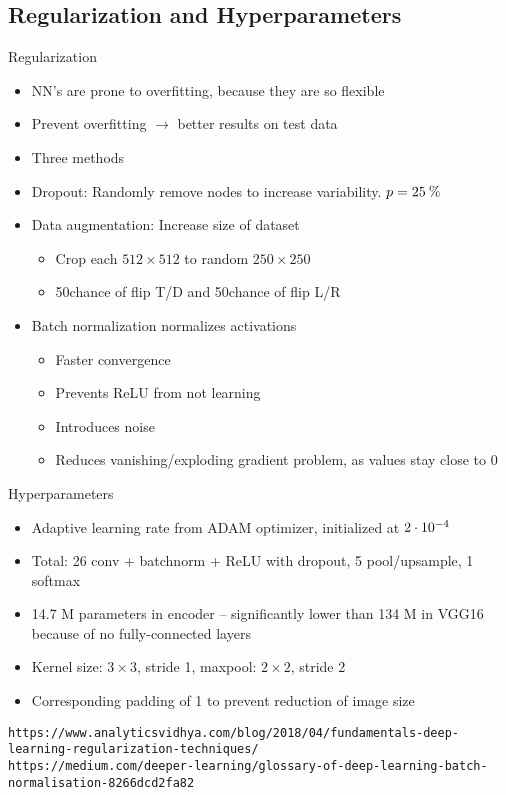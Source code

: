 \documentclass[12pt,fleqn]{article}
\begin{document}
\subsection{Regularization and Hyperparameters}
Regularization
\begin{itemize}
	\item NN's are prone to overfitting, because they are so flexible
	\item Prevent overfitting $ \to $ better results on test data
	\item Three methods
	\item Dropout: Randomly remove nodes to increase variability. $ p=25\:\text{\%{}} $
	\item Data augmentation: Increase size of dataset
	\begin{itemize}
		\item Crop each $ 512\times 512 $ to random $ 250\times 250 $
		\item 50\pro chance of flip T/D and 50\pro chance of flip L/R
	\end{itemize}
	\item Batch normalization normalizes activations
	\begin{itemize}
		\item Faster convergence
		\item Prevents ReLU from not learning
		\item Introduces noise
		\item Reduces vanishing/exploding gradient problem, as values stay close to 0
	\end{itemize}
\end{itemize}
Hyperparameters
\begin{itemize}
	\item Adaptive learning rate from ADAM optimizer, initialized at $ 2\cdot10^{-4} $
	\item Total: 26 conv + batchnorm + ReLU with dropout, 5 pool/upsample, 1 softmax
	\item 14.7 M parameters in encoder -- significantly lower than 134 M in VGG16 because of no fully-connected layers
	\item Kernel size: $ 3\times 3 $, stride 1, maxpool: $ 2\times 2 $, stride 2
	\item Corresponding padding of 1 to prevent reduction of image size
\end{itemize}
\texttt{https://www.analyticsvidhya.com/blog/2018/04/fundamentals-deep-learning-regularization-techniques/}\\
\texttt{https://medium.com/deeper-learning/glossary-of-deep-learning-batch-normalisation-8266dcd2fa82}
\end{document}
